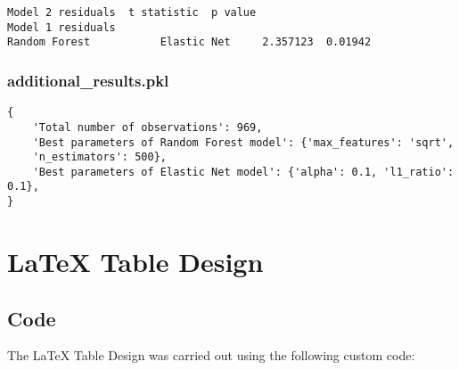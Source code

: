 \documentclass[11pt]{article}
\begin{document}
\begin{Verbatim}[tabsize=4]
                  Model 2 residuals  t statistic  p value
Model 1 residuals
Random Forest           Elastic Net     2.357123  0.01942
\end{Verbatim}

\subsubsection*{additional\_results.pkl}

\begin{Verbatim}[tabsize=4]
{
    'Total number of observations': 969,
    'Best parameters of Random Forest model': {'max_features': 'sqrt',
	'n_estimators': 500},
    'Best parameters of Elastic Net model': {'alpha': 0.1, 'l1_ratio': 0.1},
}
\end{Verbatim}

\section{LaTeX Table Design}
\subsection{{Code}}
The LaTeX Table Design was carried out using the following custom code:
\end{document}

